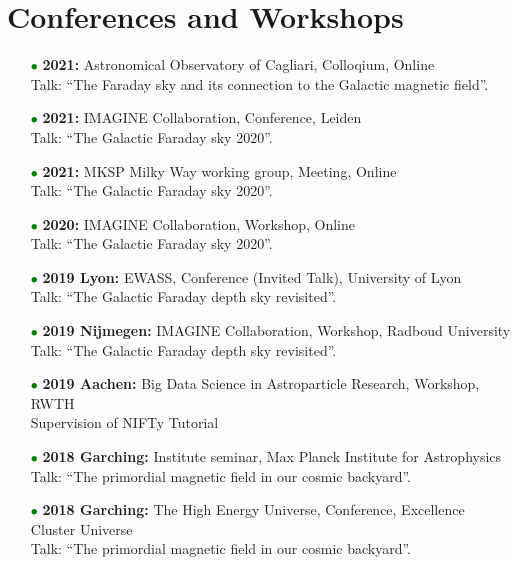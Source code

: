 \documentclass[11pt,a4paper,sans, table, dvipsnames]{moderncv}        %
\begin{document}
\section{Conferences and Workshops}
\begin{itemize}

\item[\textcolor{Green}{$\bullet$}]{\textbf{2021:} Astronomical Observatory of Cagliari, Colloqium, Online\\ Talk: ``The Faraday sky and its connection to the Galactic magnetic field''.}

\item[\textcolor{Green}{$\bullet$}]{\textbf{2021:} IMAGINE Collaboration, Conference, Leiden\\ Talk: ``The Galactic Faraday sky 2020''.}

\item[\textcolor{Green}{$\bullet$}]{\textbf{2021:} MKSP Milky Way working group, Meeting, Online\\ Talk: ``The Galactic Faraday sky 2020''.}

\item[\textcolor{Green}{$\bullet$}]{\textbf{2020:} IMAGINE Collaboration, Workshop, Online\\ Talk: ``The Galactic Faraday sky 2020''.}

\item[\textcolor{Green}{$\bullet$}]{\textbf{2019 Lyon:} EWASS, Conference (Invited Talk), University of Lyon \\ Talk: ``The Galactic Faraday depth sky revisited''.}

\item[\textcolor{Green}{$\bullet$}]{\textbf{2019 Nijmegen:} IMAGINE Collaboration, Workshop, Radboud University\\ Talk: ``The Galactic Faraday depth sky revisited''.}

\item[\textcolor{Green}{$\bullet$}]{\textbf{2019 Aachen:} Big Data Science in Astroparticle Research, Workshop, RWTH \\ Supervision of NIFTy Tutorial}

\item[\textcolor{Green}{$\bullet$}]{\textbf{2018 Garching:} Institute seminar, Max Planck Institute for Astrophysics\\ Talk: ``The primordial magnetic field in our cosmic backyard''.}

\item[\textcolor{Green}{$\bullet$}]{\textbf{2018 Garching:} The High Energy Universe, Conference, Excellence Cluster Universe \\ Talk: ``The primordial magnetic field in our cosmic backyard''.}


\end{itemize}
\end{document}
